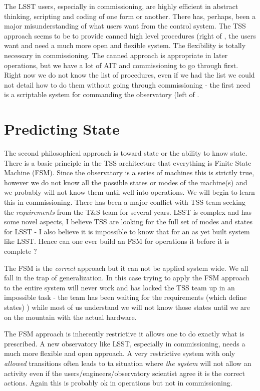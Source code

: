 The LSST users, especially in commissioning, are highly efficient in abstract thinking, scripting and coding of one form or another. There has, perhaps,  been  a major misunderstanding of what users want from the control system. The TSS approach seems to be to provide canned high level procedures (right of , the users want and need a much more open and flexible system.
The flexibility is totally necessary in commissioning.
The canned approach is appropriate in later operations, but we have  a lot of AIT and commissioning to go through first.
Right now we do not know the list of procedures, even if we had the list we could not detail how to do them without going through commissioning - the first need is a scriptable system for commanding the observatory (left of .


\section{Predicting State}

The second philosophical approach is toward state or the ability to know state. There is a basic principle in the TSS architecture that everything is  Finite State Machine (FSM).
Since the observatory is a series of machines this is strictly true, however we do not know all the possible states or modes of the machine(s) and we probably will not know them until well into operations.
We will begin to learn this in commissioning. There has been a major conflict with  TSS team seeking the {\em requirements} from the T\&S team for several years.  LSST is complex and has some novel aspects, I believe TSS are looking for the full set of modes and states for LSST - I also believe it is impossible to know that for an as yet built system like LSST. Hence can one ever build an FSM for operations it before it is complete ?

The FSM is the {\em correct} approach  but it can not be applied system wide. We all fall in the trap of generalization.
In this case trying to apply the FSM approach to the entire system will never work and has locked the TSS team up in an impossible task -
the team has been waiting for the requirements (which define states) ) while most of us understand we will not know those states until we are on the mountain with the actual hardware.

The FSM approach is inherently restrictive  it allows one to do exactly what is prescribed. A new observatory like LSST, especially in commissioning, needs a much more flexible and open approach. A very restrictive system with only {\em allowed} transitions often leads to ta situation where {\em the system} will not allow an activity even if the users/engineers/observatory scientist agree it is the correct actions. Again this is probably ok in operations but not in commissioning.

